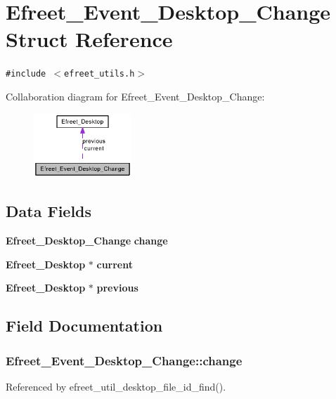 \section{Efreet\_\-Event\_\-Desktop\_\-Change Struct Reference}
\label{structEfreet__Event__Desktop__Change}
{\tt \#include $<$efreet\_\-utils.h$>$}

Collaboration diagram for Efreet\_\-Event\_\-Desktop\_\-Change:\nopagebreak
\begin{figure}[H]
\begin{center}
\leavevmode
\includegraphics[width=104pt]{structEfreet__Event__Desktop__Change__coll__graph}
\end{center}
\end{figure}
\subsection*{Data Fields}
\begin{CompactItemize}
\item 
{\bf Efreet\_\-Desktop\_\-Change} {\bf change}
\item 
{\bf Efreet\_\-Desktop} $\ast$ {\bf current}
\item 
{\bf Efreet\_\-Desktop} $\ast$ {\bf previous}
\end{CompactItemize}


\subsection{Field Documentation}
\subsubsection[change]{ {\bf Efreet\_\-Event\_\-Desktop\_\-Change::change}}\label{structEfreet__Event__Desktop__Change_67a21053f25151f4ecd071f44e75fc8d}




Referenced by efreet\_\-util\_\-desktop\_\-file\_\-id\_\-find().
